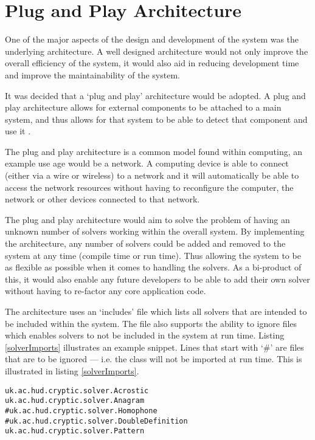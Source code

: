 \section{Plug and Play Architecture}
\label{sec:plug_and_play_architecture}

One of the major aspects of the design and development of the system was the 
underlying architecture. A well designed architecture would not only improve the
overall efficiency of the system, it would also aid in reducing development time
and improve the maintainability of the system.

It was decided that a `plug and play' architecture would be adopted. A plug and
play architecture allows for external components to be attached to a main 
system, and thus allows for that system to be able to detect that component and 
use it \citep{plug_play}.

The plug and play architecture is a common model found within computing, an 
example use age would be a network. A computing device is able to connect 
(either via a wire or wireless) to a network and it will automatically be able 
to access the network resources without having to reconfigure the computer, the 
network or other devices connected to that network.

The plug and play architecture would aim to solve the problem of having an 
unknown number of solvers working within the overall system. By implementing the
architecture, any number of solvers could be added and removed to the system at
any time (compile time or run time). Thus allowing the system to be as flexible 
as possible when it comes to handling the solvers. As a bi-product of this, it 
would also enable any future developers to be able to add their own solver 
without having to re-factor any core application code.

The architecture uses an `includes' file which lists all solvers that are 
intended to be included within the system. The file also supports the ability to
ignore files which enables solvers to not be included in the system at run time.
Listing \ref{solverImports} illustrates an example snippet. Lines that start 
with `\#' are files that are to be ignored --- i.e. the class will not be 
imported at run time. This is illustrated in listing \ref{solverImports}.

\begin{lstlisting}[caption={plug and play solver import file}, label=solverImports]  
uk.ac.hud.cryptic.solver.Acrostic
uk.ac.hud.cryptic.solver.Anagram
#uk.ac.hud.cryptic.solver.Homophone
#uk.ac.hud.cryptic.solver.DoubleDefinition
uk.ac.hud.cryptic.solver.Pattern
\end{lstlisting}

